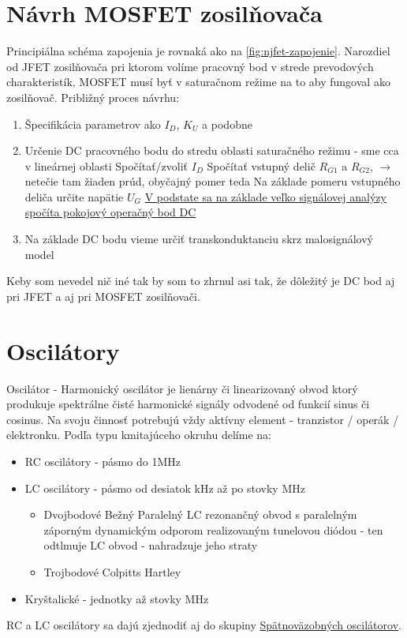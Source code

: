 \section{Návrh MOSFET zosilňovača}
Principiálna schéma zapojenia je rovnaká ako na \ref{fig:njfet-zapojenie}.
Narozdiel od JFET zosilňovača pri ktorom volíme pracovný bod v strede prevodových charakteristík, MOSFET musí byť v saturačnom režime na to aby fungoval ako zosilňovač.
Približný proces návrhu:
\begin{enumerate}
	\item Špecifikácia parametrov ako $I_D$, $K_U$ a podobne
	\item Určenie DC pracovného bodu do stredu oblasti saturačného režimu - sme cca v lineárnej oblasti
	\subitem Spočítať/zvoliť $I_D$
	\subitem Spočítať vstupný delič $R_{G1}$ a $R_{G2}$, $\rightarrow$ netečie tam žiaden prúd, obyčajný pomer teda
	\subitem Na základe pomeru vstupného deliča určite napätie $U_G$
	\subitem \underline{V podstate sa na základe veľko signálovej analýzy spočíta pokojový operačný bod DC}
	\item Na základe DC bodu vieme určiť transkonduktanciu skrz malosignálový model
\end{enumerate}
Keby som nevedel nič iné tak by som to zhrnul asi tak, že dôležitý je DC bod aj pri JFET a aj pri MOSFET zosilňovači.

\section{Oscilátory}
Oscilátor - Harmonický oscilátor je lienárny či linearizovaný obvod ktorý produkuje spektrálne čisté harmonické signály odvodené od funkcií sinus či cosinus. Na svoju činnosť potrebujú vždy aktívny element - tranzistor / operák / elektronku.
Podľa typu kmitajúceho okruhu delíme na:
\begin{itemize}
\item RC oscilátory - pásmo do 1MHz
\item LC oscilátory - pásmo od desiatok kHz až po stovky MHz
\begin{itemize}
	\item Dvojbodové
	\subitem Bežný Paralelný LC rezonančný obvod s paralelným záporným dynamickým odporom realizovaným tunelovou diódou - ten odtlmuje LC obvod - nahradzuje jeho straty
	\item Trojbodové 
	\subitem Colpitts
	\subitem Hartley
\end{itemize}
\item Kryštalické - jednotky až stovky MHz
\end{itemize}
RC a LC oscilátory sa dajú zjednodiť aj do skupiny \underline{Spätnoväzobných oscilátorov}.

